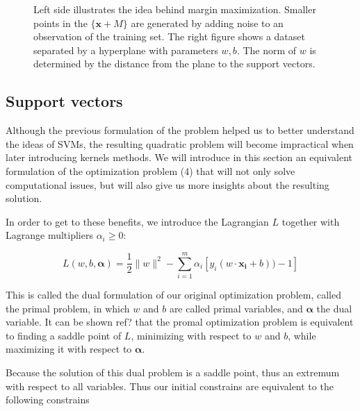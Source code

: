 \begin{figure*}
  \begin{minipage}{.5\textwidth}
    \centering
    
  \end{minipage}%
  \begin{minipage}{.5\textwidth}
    \centering
    
  \end{minipage}

  \caption{
    Left side illustrates the idea behind margin maximization. Smaller points in the $\{ \mathbf{x} + M \}$ are generated by adding noise to an observation of the training set. The right figure shows a dataset separated by a hyperplane with parameters $w, b$. The norm of $w$ is determined by the distance from the plane to the support vectors.
  }
\end{figure*}

\subsection {Support vectors}

Although the previous formulation of the problem helped us to better understand the ideas of SVMs, the resulting quadratic problem will become impractical when later introducing kernels methods. We will introduce in this section an equivalent formulation of the optimization problem (4) that will not only solve computational issues, but will also give us more insights about the resulting solution.

In order to get to these benefits, we introduce the Lagrangian $L$ together with Lagrange multipliers $\alpha_i \ge 0$:

\begin{equation}
  L(w, b, \boldsymbol{\alpha}) = \frac{1}{2}\|w\|^2 - \sum^m_{i=1} \alpha_i[y_i(w \cdot \mathbf{x_i} + b)) - 1]
\end{equation}

This is called the dual formulation of our original optimization problem, called the primal problem, in which $w$ and $b$ are called primal variables, and $\boldsymbol{\alpha}$ the dual variable. It can be shown \textcolor[rgb]{1,0,0}{ref?} that the promal optimization problem is equivalent to finding a saddle point of $L$, minimizing with respect to $w$ and $b$, while maximizing it with respect to $
\boldsymbol{\alpha}$.

Because the solution of this dual problem is a saddle point, thus an extremum with respect to all variables. Thus our initial constrains are equivalent to the following constrains

